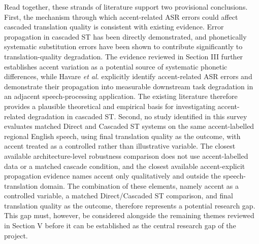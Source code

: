Read together, these strands of literature support two provisional conclusions. First, the mechanism through which accent-related ASR errors could affect cascaded translation quality is consistent with existing evidence. Error propagation in cascaded ST has been directly demonstrated, and phonetically systematic substitution errors have been shown to contribute significantly to translation-quality degradation. The evidence reviewed in Section III further establishes accent variation as a potential source of systematic phonetic differences, while Havare \textit{et al.} \cite{losttranscription2026} explicitly identify accent-related ASR errors and demonstrate their propagation into measurable downstream task degradation in an adjacent speech-processing application. The existing literature therefore provides a plausible theoretical and empirical basis for investigating accent-related degradation in cascaded ST. Second, no study identified in this survey evaluates matched Direct and Cascaded ST systems on the same accent-labelled regional English speech, using final translation quality as the outcome, with accent treated as a controlled rather than illustrative variable. The closest available architecture-level robustness comparison \cite{seamlessm4t2023,seamless2023} does not use accent-labelled data or a matched cascade condition, and the closest available accent-explicit propagation evidence \cite{losttranscription2026} names accent only qualitatively and outside the speech-translation domain. The combination of these elements, namely accent as a controlled variable, a matched Direct/Cascaded ST comparison, and final translation quality as the outcome, therefore represents a potential research gap. This gap must, however, be considered alongside the remaining themes reviewed in Section V before it can be established as the central research gap of the project.
